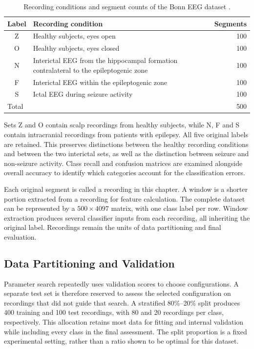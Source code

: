 \begin{table}[htbp]
    \centering
    \caption{Recording conditions and segment counts
    of the Bonn EEG dataset \cite{Andrzejak2001}.}
    \label{tab:bonn-five-classes}
    \renewcommand{\arraystretch}{1.2}
    \begin{tabular}{cp{}r}
        \hline
        Label & Recording condition & Segments \\
        \hline
        Z & Healthy subjects, eyes open & 100 \\
        O & Healthy subjects, eyes closed & 100 \\
        N & Interictal EEG from the hippocampal formation
            contralateral to the epileptogenic zone & 100 \\
        F & Interictal EEG within the epileptogenic zone & 100 \\
        S & Ictal EEG during seizure activity & 100 \\
        \hline
        \multicolumn{2}{l}{Total} & 500 \\
        \hline
    \end{tabular}
\end{table}

Sets Z and O contain scalp recordings from healthy
subjects, while N, F and S contain intracranial recordings
from patients with epilepsy. All five original labels
are retained. This preserves distinctions between the
healthy recording conditions and between the two
interictal sets, as well as the distinction between
seizure and non-seizure activity. Class recall and
confusion matrices are examined alongside overall
accuracy to identify which categories account for
the classification errors.

Each original segment is called a recording in this
chapter. A window is a shorter portion extracted
from a recording for feature calculation. The complete
dataset can be represented by a $500\times4097$ matrix,
with one class label per row. Window extraction produces
several classifier inputs from each recording, all
inheriting the original label. Recordings remain the
units of data partitioning and final evaluation.



\subsection{Data Partitioning and Validation}
\label{subsec:data-partitioning}

Parameter search repeatedly uses validation scores to choose configurations.
A separate test set is therefore reserved to assess the selected configuration
on recordings that did not guide that search. A stratified 80\%--20\% split
produces 400 training and 100 test recordings, with 80 and 20 recordings per
class, respectively. This allocation retains most data for fitting and internal
validation while including every class in the final assessment. The split
proportion is a fixed experimental setting, rather than a ratio shown to be
optimal for this dataset.

